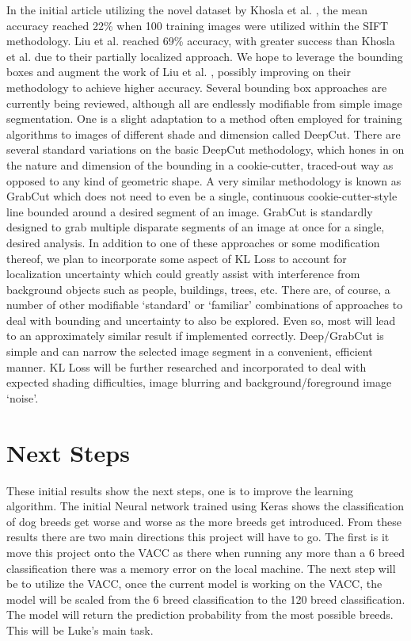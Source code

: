 \documentclass[12pt]{article}
\begin{document}
In the initial article utilizing the novel dataset by Khosla et al. \cite{khosla2011novel}, the mean accuracy reached 22\% when 100 training images were utilized within the SIFT methodology. Liu et al. \cite{liu2012dog} reached 69\% accuracy, with greater success than Khosla et al. \cite{khosla2011novel} due to their partially localized approach.  We hope to leverage the bounding boxes and augment the work of Liu et al. \cite{liu2012dog}, possibly improving on their methodology to achieve higher accuracy. Several bounding box approaches are currently being reviewed, although all are endlessly modifiable from simple image segmentation. One is a slight adaptation to a method often employed for training algorithms to images of different shade and dimension called DeepCut.  \cite{rajchl2016deepcut} There are several standard variations on the basic DeepCut methodology, which hones in on the nature and dimension of the bounding in a cookie-cutter, traced-out way as opposed to any kind of geometric shape. A very similar methodology is known as GrabCut which does not need to even be a single, continuous cookie-cutter-style line bounded around a desired segment of an image. GrabCut is standardly designed to grab multiple disparate segments of an image at once for a single, desired analysis. In addition to one of these approaches or some modification thereof, we plan to incorporate some aspect of KL Loss to account for localization uncertainty which could greatly assist with interference from background objects such as people, buildings, trees, etc. \cite{he2019bounding} There are, of course, a number of other modifiable ‘standard’ or ‘familiar’ combinations of approaches to deal with bounding and uncertainty to also be explored. Even so, most will lead to an approximately similar result if implemented correctly. Deep/GrabCut is simple and can narrow the selected image segment in a convenient, efficient manner. KL Loss will be further researched and incorporated to deal with expected shading difficulties, image blurring and background/foreground image ‘noise’.

\section{Next Steps}

These initial results show the next steps, one is to improve the learning algorithm.  The initial Neural network trained using Keras shows the classification of dog breeds get worse and worse as the more breeds get introduced.  From these results there are two main directions this project will have to go.  The first is it move this project onto the VACC as there when running any more than a 6 breed classification there was a memory error on the local machine.  The next step will be to utilize the VACC, once the current model is working on the VACC, the model will be scaled from the 6 breed classification to the 120 breed classification.  The model will return the prediction probability from the most possible breeds.  This will be Luke's main task.
\end{document}
